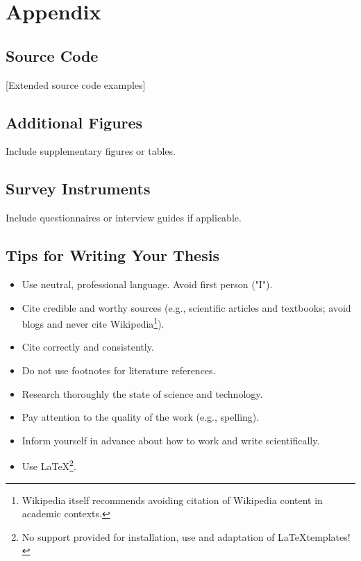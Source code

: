 \documentclass[oneside,12pt]{book}
\begin{document}
\appendix

\chapter{Appendix}

\section{Source Code}
[Extended source code examples]

\section{Additional Figures}
Include supplementary figures or tables.

\section{Survey Instruments}
Include questionnaires or interview guides if applicable.


\section{Tips for Writing Your Thesis}

\begin{itemize}
\item Use neutral, professional language. Avoid first person ("I").
\item Cite credible and worthy sources (e.g., scientific articles and textbooks; avoid blogs and never cite Wikipedia\footnote{Wikipedia itself recommends avoiding citation of Wikipedia content in academic contexts.}).
\item Cite correctly and consistently.
\item Do not use footnotes for literature references.
\item Research thoroughly the state of science and technology.
\item Pay attention to the quality of the work (e.g., spelling).
\item Inform yourself in advance about how to work and write scientifically.
\item Use \LaTeX\footnote{No support provided for installation, use and adaptation of \LaTeX templates!}.
\end{itemize}

\backmatter

\end{document}
